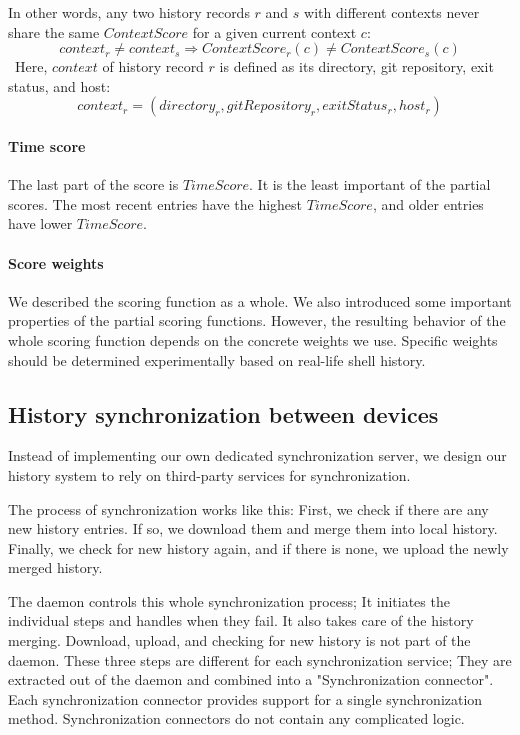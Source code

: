 In other words, any two history records \(r\) and \(s\) with different contexts never share the same \(ContextScore\) for a given current context \(c\):
\[ context_{r} \neq context_{s} \Rightarrow ContextScore_r(c) \neq ContextScore_s(c) \]\
Here, \(context\) of history record \(r\) is defined as its directory, git repository, exit status, and host:
\[ context_r = (directory_r, gitRepository_r, exitStatus_r, host_r) \]

\paragraph{Time score}

The last part of the score is \(TimeScore\). It is the least important of the partial scores. The most recent entries have the highest \(TimeScore\), and older entries have lower \(TimeScore\). 

\paragraph{Score weights}

We described the scoring function as a whole. We also introduced some important properties of the partial scoring functions. However, the resulting behavior of the whole scoring function depends on the concrete weights we use. 
Specific weights should be determined experimentally based on real-life shell history.

\subsection{History synchronization between devices}

Instead of implementing our own dedicated synchronization server, we design our history system to rely on third-party services for synchronization. 

The process of synchronization works like this: First, we check if there are any new history entries. If so, we download them and merge them into local history. Finally, we check for new history again, and if there is none, we upload the newly merged history. 

The daemon controls this whole synchronization process; It initiates the individual steps and handles when they fail. It also takes care of the history merging. Download, upload, and checking for new history is not part of the daemon. These three steps are different for each synchronization service; They are extracted out of the daemon and combined into a "Synchronization connector". Each synchronization connector provides support for a single synchronization method. Synchronization connectors do not contain any complicated logic. 


